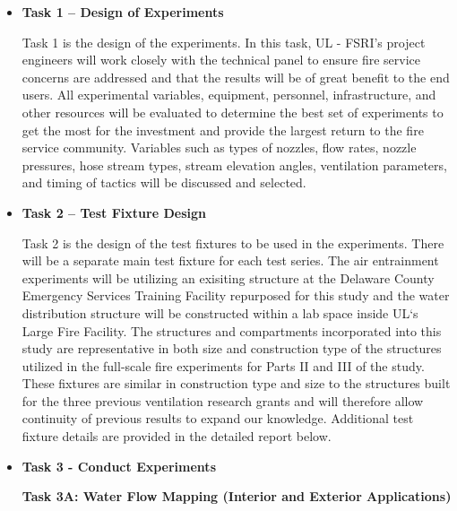 \documentclass{article}
\begin{document}
\begin{itemize}

\item \bf{Task 1 – Design of Experiments}
\normalfont
\vspace*{\baselineskip}

Task 1 is the design of the experiments. In this task, UL - FSRI's project engineers will work closely with the technical panel to ensure fire service concerns are addressed and that the results will be of great benefit to the end users. All experimental variables, equipment, personnel, infrastructure, and other resources will be evaluated to determine the best set of experiments to get the most for the investment and provide the largest return to the fire service community. Variables such as types of nozzles, flow rates, nozzle pressures, hose stream types, stream elevation angles, ventilation parameters, and timing of tactics will be discussed and selected.  
\vspace*{\baselineskip}

\item \bf{Task 2 – Test Fixture Design}
\normalfont
\vspace*{\baselineskip}

Task 2 is the design of the test fixtures to be used in the experiments. There will be a separate main test fixture for each test series. The air entrainment experiments will be utilizing an exisiting structure at the Delaware County Emergency Services Training Facility repurposed for this study and the water distribution structure will be constructed within a lab space inside UL`s Large Fire Facility. The structures and compartments incorporated into this study are representative in both size and construction type of the structures utilized in the full-scale fire experiments for Parts II and III of the study. These fixtures are similar in construction type and size to the structures built for the three previous ventilation research grants and will therefore allow continuity of previous results to expand our knowledge. Additional test fixture details are provided in the detailed report below.
\vspace*{\baselineskip}

\item \bf{Task 3 - Conduct Experiments}
\normalfont
\vspace*{\baselineskip}

\subitem \bf{Task 3A:  Water Flow Mapping (Interior and Exterior Applications)}
\normalfont
\vspace*{\baselineskip} 


\end{itemize}
\end{document}
